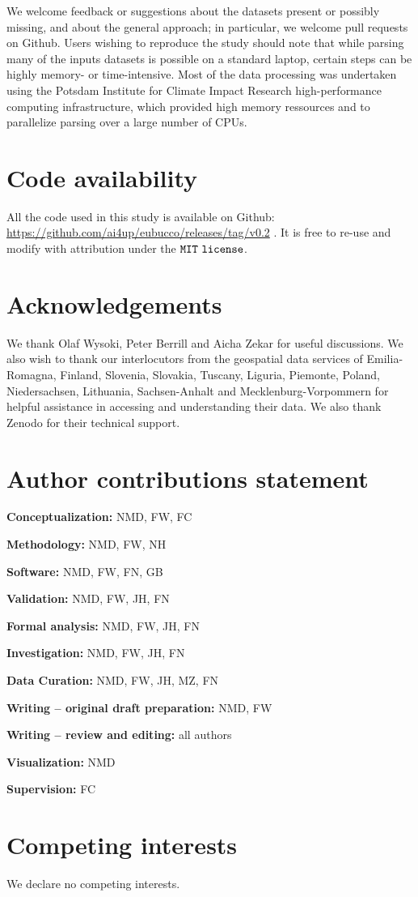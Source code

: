 \documentclass[fleqn,10pt]{wlscirep}
\begin{document}
We welcome feedback or suggestions about the datasets present or possibly missing, and about the general approach; in particular, we welcome pull requests on Github. Users wishing to reproduce the study should note that while parsing many of the inputs datasets is possible on a standard laptop, certain steps can be highly memory- or time-intensive. Most of the data processing was undertaken using the Potsdam Institute for Climate Impact Research high-performance computing infrastructure, which provided high memory ressources and to parallelize parsing over a large number of CPUs.

\section*{Code availability}

All the code used in this study is available on Github: \url{https://github.com/ai4up/eubucco/releases/tag/v0.2} \cite{eubucco-0.2-code2022}. It is free to re-use and modify with attribution under the ${\tt MIT\ license}$.





\section*{Acknowledgements} 

We thank Olaf Wysoki, Peter Berrill and Aicha Zekar for useful discussions. We also wish to thank our interlocutors from the geospatial data services of Emilia-Romagna, Finland, Slovenia, Slovakia, Tuscany, Liguria, Piemonte, Poland, Niedersachsen, Lithuania, Sachsen-Anhalt and Mecklenburg-Vorpommern  for helpful assistance in accessing and understanding their data. We also thank Zenodo for their technical support.


\section*{Author contributions statement}

\textbf{Conceptualization:} NMD, FW, FC

\noindent \textbf{Methodology:} NMD, FW, NH 	

\noindent \textbf{Software:} NMD, FW, FN, GB	

\noindent \textbf{Validation:} NMD, FW, JH, FN	

\noindent \textbf{Formal analysis:} NMD, FW, JH, FN	

\noindent \textbf{Investigation:} NMD, FW, JH, FN

\noindent \textbf{Data Curation:} NMD, FW, JH, MZ, FN

\noindent \textbf{Writing – original draft preparation:} NMD, FW	

\noindent \textbf{Writing – review and editing:} all authors  

\noindent \textbf{Visualization:} NMD	

\noindent \textbf{Supervision:} FC


\section*{Competing interests}

We declare no competing interests.
\end{document}
